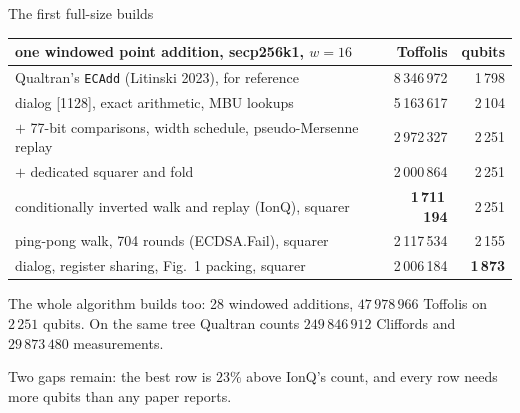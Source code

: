 \documentclass[aspectratio=169,11pt]{beamer}
\begin{document}
\begin{frame}{The first full-size builds}
  \centering\footnotesize
  \renewcommand{\arraystretch}{1.12}
  \begin{tabular}{@{}lrr@{}}
    \toprule
    one windowed point addition, secp256k1, $w=16$ & Toffolis & qubits \\
    \midrule
    Qualtran's \texttt{ECAdd} (Litinski 2023), for reference & 8\,346\,972 & 1\,798 \\
    dialog [1128], exact arithmetic, MBU lookups & 5\,163\,617 & 2\,104 \\
    \quad $+$ 77-bit comparisons, width schedule, pseudo-Mersenne replay & 2\,972\,327 & 2\,251 \\
    \quad $+$ dedicated squarer and fold & 2\,000\,864 & 2\,251 \\
    conditionally inverted walk and replay (IonQ), squarer & \textbf{1\,711\,194} & 2\,251 \\
    ping-pong walk, 704 rounds (ECDSA.Fail), squarer & 2\,117\,534 & 2\,155 \\
    dialog, register sharing, Fig.~1 packing, squarer & 2\,006\,184 & \textbf{1\,873} \\
    \bottomrule
  \end{tabular}\par
  \vskip2mm
  \raggedright\small
  The whole algorithm builds too: 28 windowed additions, $47\,978\,966$ Toffolis on $2\,251$ qubits. On the same tree Qualtran counts $249\,846\,912$ Cliffords and $29\,873\,480$ measurements.
  \begin{takeaway}Two gaps remain: the best row is $23\%$ above IonQ's count, and every row needs more qubits than any paper reports.\end{takeaway}
\end{frame}
\end{document}
